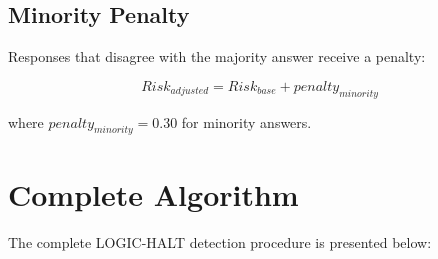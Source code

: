 \subsection{Minority Penalty}

Responses that disagree with the majority answer receive a penalty:

\begin{equation}
    Risk_{adjusted} = Risk_{base} + penalty_{minority}
\end{equation}

where $penalty_{minority} = 0.30$ for minority answers.

\section{Complete Algorithm}

The complete LOGIC-HALT detection procedure is presented below:

